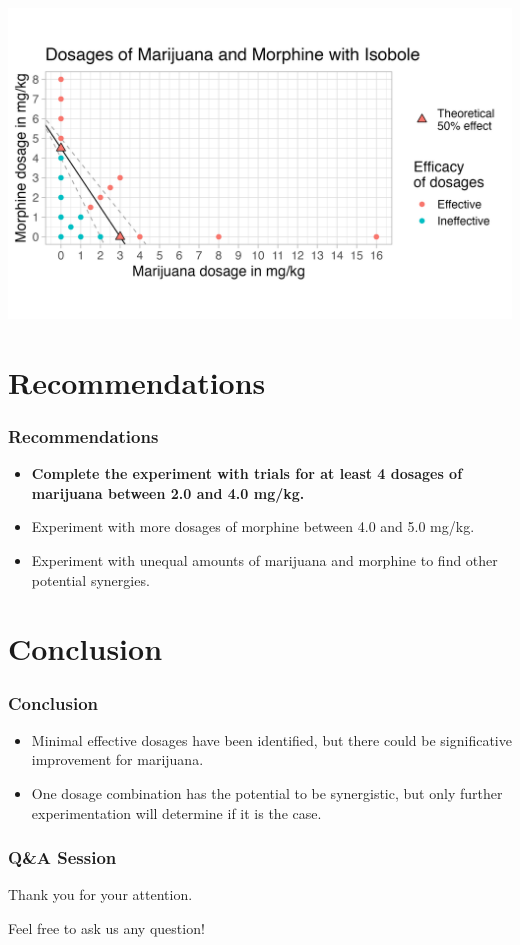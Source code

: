 \documentclass[14pt]{beamer}
\begin{document}
\begin{frame}
\includegraphics[scale=0.6]{isobole-vary.png}
\end{frame}

\section{Recommendations}

\begin{frame}
\frametitle{Recommendations}
\begin{itemize}[label={\checkmark}]
\item \textbf{Complete the experiment with trials for at least 4 dosages of marijuana between 2.0 and 4.0 mg/kg.}
\item Experiment with more dosages of morphine between 4.0 and 5.0 mg/kg.
\item Experiment with unequal amounts of marijuana and morphine to find other potential synergies.
\end{itemize}
\end{frame}

\section{Conclusion}
\begin{frame}
\frametitle{Conclusion}
\begin{itemize}[label={$\blacktriangleright$}]
\item Minimal effective dosages have been identified, but there could be significative improvement for marijuana.
\item One dosage combination has the potential to be synergistic, but only further experimentation will determine if it is the case.
\end{itemize}
\end{frame}

\begin{frame}
\frametitle{Q\&A Session}
Thank you for your attention. 

\bigskip

Feel free to ask us any question!
\end{frame}
\end{document}
